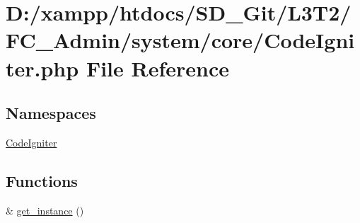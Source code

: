 \hypertarget{_code_igniter_8php}{}\section{D\+:/xampp/htdocs/\+S\+D\+\_\+\+Git/\+L3\+T2/\+F\+C\+\_\+\+Admin/system/core/\+Code\+Igniter.php File Reference}
\label{_code_igniter_8php}
\subsection*{Namespaces}
\begin{DoxyCompactItemize}
\item 
 \hyperlink{namespace_code_igniter}{Code\+Igniter}
\end{DoxyCompactItemize}
\subsection*{Functions}
\begin{DoxyCompactItemize}
\item 
\& \hyperlink{_code_igniter_8php_a185483844bd20a0e80955460d66d2199}{get\+\_\+instance} ()
\end{DoxyCompactItemize}
